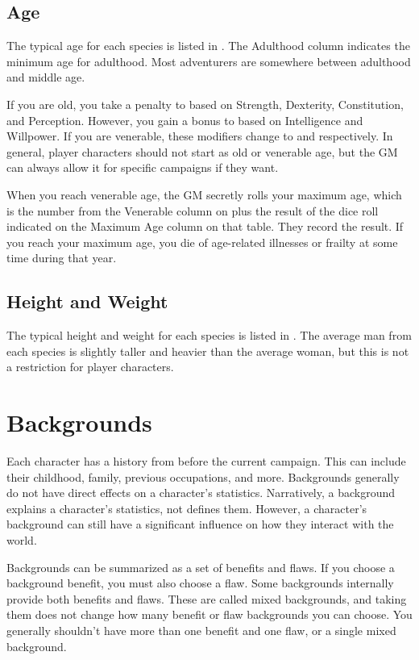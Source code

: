     \subsection{Age}
        The typical age for each species is listed in .
        The Adulthood column indicates the minimum age for adulthood.
        Most adventurers are somewhere between adulthood and middle age.

        If you are old, you take a  penalty to  based on Strength, Dexterity, Constitution, and Perception.
        However, you gain a  bonus to  based on Intelligence and Willpower.
        If you are venerable, these modifiers change to  and  respectively.
        In general, player characters should not start as old or venerable age, but the GM can always allow it for specific campaigns if they want.

        When you reach venerable age, the GM secretly rolls your maximum age, which is the number from the Venerable column on  plus the result of the dice roll indicated on the Maximum Age column on that table.
        They record the result.
        If you reach your maximum age, you die of age-related illnesses or frailty at some time during that year.

    \subsection{Height and Weight}
        The typical height and weight for each species is listed in .
        The average man from each species is slightly taller and heavier than the average woman, but this is not a restriction for player characters.

\section{Backgrounds}
    Each character has a history from before the current campaign.
    This can include their childhood, family, previous occupations, and more.
    Backgrounds generally do not have direct effects on a character's statistics.
    Narratively, a background explains a character's statistics, not defines them.
    However, a character's background can still have a significant influence on how they interact with the world.

    Backgrounds can be summarized as a set of benefits and flaws.
    If you choose a background benefit, you must also choose a flaw.
    Some backgrounds internally provide both benefits and flaws.
    These are called mixed backgrounds, and taking them does not change how many benefit or flaw backgrounds you can choose.
    You generally shouldn't have more than one benefit and one flaw, or a single mixed background.

